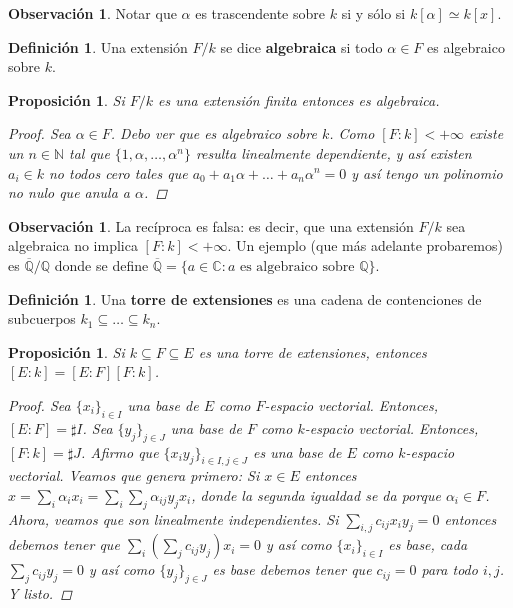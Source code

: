 \documentclass[12pt]{book}
\newtheorem{prop}[teo]{Proposición}
\theoremstyle{definition}
\newtheorem{obs}[teo]{Observación}
\newtheorem{defn}[teo]{Definición}
\newcommand{\CC}{\mathbb{C}}
\newcommand{\NN}{\mathbb{N}}
\newcommand{\QQ}{\mathbb{Q}}
\begin{document}
\begin{obs}
Notar que $\alpha$ es trascendente sobre $k$ si y sólo si $k[\alpha]\simeq k[x]$.
\end{obs}

\begin{defn}
Una extensión $F/k$ se dice \textbf{algebraica} si todo $\alpha\in F$ es algebraico sobre $k$.
\end{defn}

\begin{prop}
Si $F/k$ es una extensión finita entonces es algebraica.
\begin{proof}
Sea $\alpha\in F$. Debo ver que es algebraico sobre $k$. Como $[F:k]<+\infty$ existe un $n\in \NN$ tal que $\{1,\alpha,\ldots , \alpha^{n}\}$ resulta linealmente dependiente, y así existen $a_i\in k$ no todos cero tales que $a_0 + a_1 \alpha + \ldots + a_{n}\alpha^{n} = 0$ y así tengo un polinomio no nulo que anula a $\alpha$.
\end{proof}
\end{prop}

\begin{obs}
La recíproca es falsa: es decir, que una extensión $F/k$ sea algebraica no implica $[F:k]<+\infty$. Un ejemplo (que más adelante probaremos) es $\overline{\QQ}/\QQ$ donde se define $\overline{\QQ} = \{a\in\CC : a \text{ es algebraico sobre }\QQ\}$.
\end{obs}

\begin{defn}
Una \textbf{torre de extensiones} es una cadena de contenciones de subcuerpos $k_1\subseteq \ldots \subseteq k_n$.
\end{defn}

\begin{prop}
Si $k\subseteq F\subseteq E$ es una torre de extensiones, entonces $[E:k] = [E:F][F:k]$.
\begin{proof}
Sea $\{x_i\}_{i\in I}$ una base de $E$ como $F$-espacio vectorial. Entonces, $[E:F] = \sharp I$. Sea $\{y_j\}_{j\in J}$ una base de $F$ como $k$-espacio vectorial. Entonces, $[F:k]=\sharp J$. Afirmo que $\{x_i y_j\}_{i\in I, j\in J}$ es una base de $E$ como $k$-espacio vectorial. Veamos que genera primero: Si $x\in E$ entonces $x=\displaystyle\sum_{i} \alpha_i x_i = \displaystyle\sum_{i}\sum_{j} \alpha_{ij}y_j x_i$, donde la segunda igualdad se da porque $\alpha_i \in F$. Ahora, veamos que son linealmente independientes. Si $\displaystyle\sum_{i,j}c_{ij}x_iy_j=0$ entonces debemos tener que $\displaystyle\sum_{i}\left(\sum_{j}c_{ij}y_j\right) x_i = 0$ y así como $\{x_i\}_{i\in I}$ es base, cada $\displaystyle\sum_{j}c_{ij}y_j=0$ y así como $\{y_j\}_{j\in J}$ es base debemos tener que $c_{ij}=0$ para todo $i,j$. Y listo.
\end{proof}
\end{prop}
\end{document}

